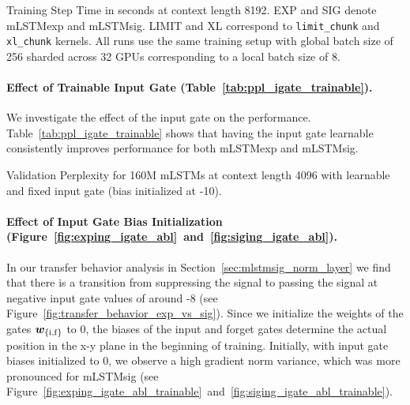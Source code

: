 \documentclass{article}
\begin{document}
        \begin{table}[htbp]
        \centering
        \caption{Training Step Time in seconds at {context length 8192}. \textsc{EXP} and \textsc{SIG} denote mLSTMexp and mLSTMsig. \textsc{LIMIT} and \textsc{XL} correspond to \texttt{limit\_chunk} and \texttt{xl\_chunk} kernels. All runs use the same training setup with global batch size of 256 sharded across 32 GPUs corresponding to a local batch size of 8.}
        \vspace{0.2cm}
        \begin{adjustbox}{width=0.6\textwidth}
                
        \end{adjustbox}
        \label{tab:ppl_siging_8k}
    \end{table}

    \paragraph{Effect of Trainable Input Gate (Table~\ref{tab:ppl_igate_trainable}).}
    We investigate the effect of the input gate on the performance.
    Table~\ref{tab:ppl_igate_trainable} shows that having the input gate learnable consistently improves performance for both mLSTMexp and mLSTMsig.
    \begin{table}[htbp]
        \centering
        \caption{Validation Perplexity for 160M mLSTMs at context length 4096 with learnable and fixed input gate (bias initialized at -10).}
        \vspace{0.2cm}
            \begin{adjustbox}{width=0.3\textwidth}
                
            \end{adjustbox}
        \label{tab:ppl_igate_trainable}
    \end{table}

    \paragraph{Effect of Input Gate Bias Initialization (Figure~\ref{fig:exping_igate_abl}~and~\ref{fig:siging_igate_abl}).}
    In our transfer behavior analysis in Section~\ref{sec:mlstmsig_norm_layer} we find that there is a transition from suppressing the signal to passing the signal at negative input gate values of around -8 (see Figure~\ref{fig:transfer_behavior_exp_vs_sig}).
    Since we initialize the weights of the gates $\bm{w}_{\{\mathrm{i}, \mathrm{f}\}}$ to 0, the biases of the input and forget gates determine the actual position in the x-y plane in the beginning of training.
    Initially, with input gate biases initialized to 0, we observe a high gradient norm variance, which was more pronounced for mLSTMsig (see Figure~\ref{fig:exping_igate_abl_trainable}~and~\ref{fig:siging_igate_abl_trainable}).
\end{document}
